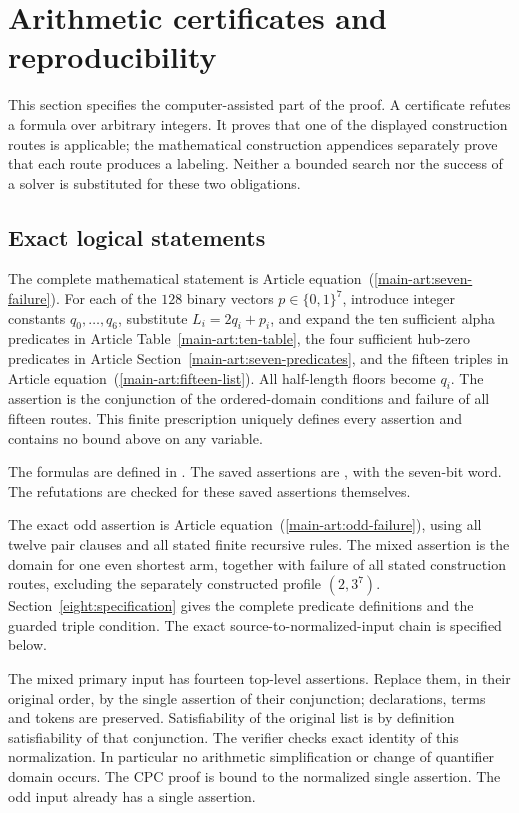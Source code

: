\section{Arithmetic certificates and reproducibility}\label{app:seven-certificates}
This section specifies the computer-assisted part of the proof. A certificate refutes a formula over arbitrary integers. It proves that one of the displayed construction routes is applicable; the mathematical construction appendices separately prove that each route produces a labeling. Neither a bounded search nor the success of a solver is substituted for these two obligations.

\subsection{Exact logical statements}


The complete mathematical statement is Article equation~\textup{(\ref*{main-art:seven-failure})}. For each of the $128$ binary vectors $p\in\{0,1\}^7$, introduce integer constants $q_0,\ldots,q_6$, substitute $L_i=2q_i+p_i$, and expand the ten sufficient alpha predicates in Article Table~\ref*{main-art:ten-table}, the four sufficient hub-zero predicates in Article Section~\ref*{main-art:seven-predicates}, and the fifteen triples in Article equation~\textup{(\ref*{main-art:fifteen-list})}. All half-length floors become $q_i$. The assertion is the conjunction of the ordered-domain conditions and failure of all fifteen routes. This finite prescription uniquely defines every assertion and contains no bound above on any variable.

The formulas are defined in . The saved assertions are , with  the seven-bit word. The refutations are checked for these saved assertions themselves.


The exact odd assertion is Article equation~\textup{(\ref*{main-art:odd-failure})}, using all twelve pair clauses and all stated finite recursive rules. The mixed assertion is the domain for one even shortest arm, together with failure of all stated construction routes, excluding the separately constructed profile $(2,3^7)$. Section~\ref{eight:specification} gives the complete predicate definitions and the guarded triple condition. The exact source-to-normalized-input chain is specified below.

The mixed primary input has fourteen top-level assertions. Replace them, in their original order, by the single assertion of their conjunction; declarations, terms and tokens are preserved. Satisfiability of the original list is by definition satisfiability of that conjunction. The verifier checks exact identity of this normalization. In particular no arithmetic simplification or change of quantifier domain occurs. The CPC proof is bound to the normalized single assertion. The odd input already has a single assertion.



